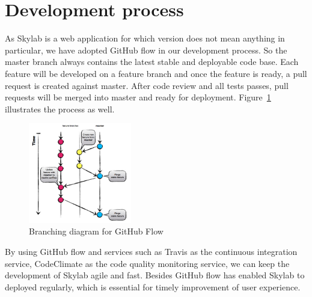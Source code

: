 \section{Development process}

As Skylab is a web application for which version does not mean anything in particular, we have adopted GitHub flow in our development process\cite{citation8}. So the master branch always contains the latest stable and deployable code base. Each feature will be developed on a feature branch and once the feature is ready, a pull request is created against master. After code review and all tests passes, pull requests will be merged into master and ready for deployment. Figure~\ref{fig:GithubFlow} illustrates the process as well\cite{citation8}.

\begin{figure}[h]
  \centering
  \includegraphics[width=0.4\textwidth]{Images/Github_Flow_Branching_Model.jpg}
  \caption{Branching diagram for GitHub Flow}
  \label{fig:GithubFlow}
\end{figure}

By using GitHub flow and services such as Travis as the continuous integration service, CodeClimate as the code quality monitoring service, we can keep the development of Skylab agile and fast. Besides GitHub flow has enabled Skylab to deployed regularly, which is essential for timely improvement of user experience\cite{citation9}.
